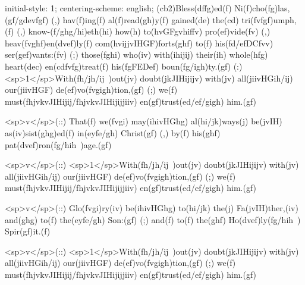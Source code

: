 initial-style: 1;
centering-scheme: english;
(cb2)Bless(dffg)ed(f) Ni(f)cho(fg)las,(gf/gdevfgf) (,) hav(f)ing(f) al(f)read(gh)y(f) gained(de) the(cd) tri(fvfgf)umph,(f) (,) know-(f/ghg/hi)eth(hi) how(h) to(hvGFgvhiffv) pro(ef)vide(fv) (,) heav(fvghf)en(dvef)ly(f) com(hvijjvIHGF)forts(ghf) to(f) his(fd/efDCfvv) ser(gef)vants:(fv) (;) those(fghi) who(iv) with(ihijij) their(ih) whole(hfg) heart(dec) en(cdfvfg)treat(f) his(fgFEDef) boun(fg/igh)ty.(gf) (:) <sp>1</sp>With(fh/jh/ij~)out(jv) doubt(jkJIHijijv) with(jv) all(jiivHGih/ij) our(jiivHGF) de(ef)vo(fvgigh)tion,(gf) (;) we(f) must(fhjvkvJIHijij/fhjvkvJIHijijjiiv) en(gf)trust(ed/ef/gigh) him.(gf)

<sp>v</sp>(::) That(f) we(fvgi) may(ihivHGhg) al(hi/jk)ways(j) be(jvIH) as(iv)sist(ghg)ed(f) in(eyfe/gh) Christ(gf) (,) by(f) his(ghf) pat(dvef)ron(fg/hih~)age.(gf)

<sp>v</sp>(::) <sp>1</sp>With(fh/jh/ij~)out(jv) doubt(jkJIHijijv) with(jv) all(jiivHGih/ij) our(jiivHGF) de(ef)vo(fvgigh)tion,(gf) (;) we(f) must(fhjvkvJIHijij/fhjvkvJIHijijjiiv) en(gf)trust(ed/ef/gigh) him.(gf)

<sp>v</sp>(::) Glo(fvgi)ry(iv) be(ihivHGhg) to(hi/jk) the(j) Fa(jvIH)ther,(iv) and(ghg) to(f) the(eyfe/gh) Son:(gf) (;) and(f) to(f) the(ghf) Ho(dvef)ly(fg/hih~) Spir(gf)it.(f)

<sp>v</sp>(::) <sp>1</sp>With(fh/jh/ij~)out(jv) doubt(jkJIHijijv) with(jv) all(jiivHGih/ij) our(jiivHGF) de(ef)vo(fvgigh)tion,(gf) (;) we(f) must(fhjvkvJIHijij/fhjvkvJIHijijjiiv) en(gf)trust(ed/ef/gigh) him.(gf)